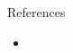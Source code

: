 \documentclass[final,t]{beamer}
\begin{document}
\begin{columns}[t]
\begin{column}{.33\linewidth}
% 
%



\begin{block}{References}

\begin{itemize}
\item
\end{itemize}
\vspace{-0.2cm}
\end{block}

\end{column}

\end{columns}
\end{document}
